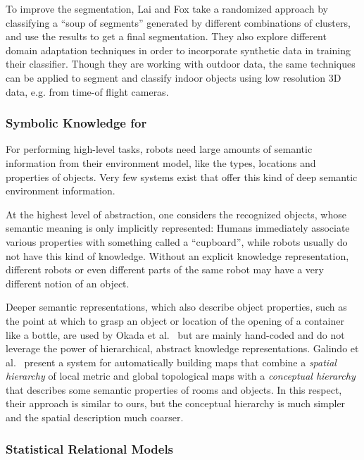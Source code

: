 To improve the segmentation, Lai and Fox \cite{Lai-RSS-09} take a randomized approach
by classifying a ``soup of segments'' generated by different combinations of clusters,
and use the results to get a final segmentation. They also explore different domain
adaptation techniques in order to incorporate synthetic data in training their classifier.
Though they are working with outdoor data, the same techniques can be applied to segment
and classify indoor objects using low resolution 3D data, e.g. from time-of flight cameras.

\subsubsection{Symbolic Knowledge for \ksem}
\label{sec:knowledge-representation}
For performing high-level tasks, robots need large amounts of semantic information from their environment model,
like the types, locations and properties of objects. Very few systems exist that offer this kind
of deep semantic environment information.

At the highest level of abstraction, one considers
the recognized objects, whose semantic meaning is only implicitly represented: Humans immediately
associate various properties with something called a ``cupboard'', while robots usually do not have
this kind of knowledge. Without an explicit knowledge representation, different robots or even different
parts of the same robot may have a very different notion of an object.

Deeper semantic representations, which also describe object properties, such as the point at which to grasp
an object or location of the opening of a container like a bottle, are used by Okada et al.~\cite{okada2007iros} but are mainly hand-coded
and do not leverage the power of hierarchical, abstract knowledge representations.
Galindo et al.~\cite{galindo08taskplanning} present a system for automatically building maps that
combine a \emph{spatial hierarchy} of local metric and global topological maps with a \emph{conceptual
hierarchy} that describes some semantic properties of rooms and objects. In this respect, their approach is
similar to ours, but the conceptual hierarchy is much simpler and the spatial description much coarser.


\subsubsection{Statistical Relational Models}
\label{sec:markov}

